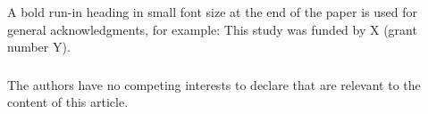 \documentclass[runningheads]{llncs}
\begin{document}

\begin{credits}
    \subsubsection{\ackname} A bold run-in heading in small font size at the end of the paper is used for
    general acknowledgments, for example: This study was funded by X (grant number
    Y).

    \subsubsection{\discintname}
    The authors have no competing interests to declare that are relevant to the
    content of this article.
\end{credits}

%


\end{document}
